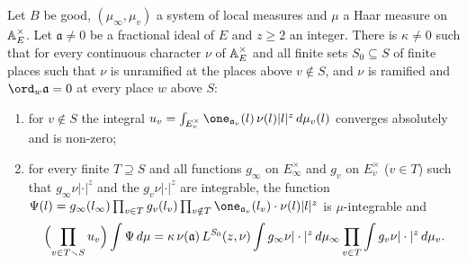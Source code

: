\begin{lemma}\label{pf:thmK:idelefub}
Let $B$ be good, $(\mu_\infty,\mu_v)$ a system of local measures and $\mu$ a Haar measure on $\mathbb{A}_E^\times$. Let
$\mathfrak a\ne0$ be a fractional ideal of $E$ and $z\ge2$ an integer. There is $\kappa\ne0$ such that for every continuous
character $\nu$ of $\mathbb{A}_E^\times$ and all finite sets $S_0\subseteq S$ of finite places such that $\nu$ is unramified at
the places above $v\notin S$, and $\nu$ is ramified and $\ord_w\mathfrak a=0$ at every place $w$ above $S$:
\begin{enumerate}
\item for $v\notin S$ the integral $u_v=\int_{E_v^\times}\one_{\mathfrak a_v}(l)\,\nu(l)|l|^z\,d\mu_v(l)$ converges
absolutely and is non-zero;
\item for every finite $T\supseteq S$ and all functions $g_\infty$ on $E_\infty^\times$ and $g_v$ on $E_v^\times$
($v\in T$) such that $g_\infty\nu|\cdot|^z$ and the $g_v\nu|\cdot|^z$ are integrable, the function
$\Psi(l)=g_\infty(l_\infty)\prod_{v\in T}g_v(l_v)\prod_{v\notin T}\one_{\mathfrak a_v}(l_v)\cdot\nu(l)|l|^z$ is
$\mu$-integrable and
\begin{equation}\label{pf:thmK:eq:idelefub}
\Bigl(\prod_{v\in T\smallsetminus S}u_v\Bigr)\int\Psi\,d\mu=\kappa\,\nu(\mathfrak a)\,L^{S_0}(z,\nu)\int g_\infty\nu
|\cdot|^z\,d\mu_\infty\prod_{v\in T}\int g_v\nu|\cdot|^z\,d\mu_v .
\end{equation}
\end{enumerate}
\end{lemma}

